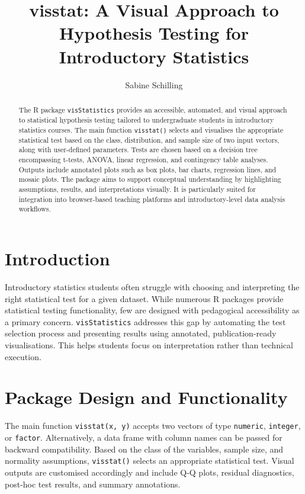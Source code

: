 \documentclass[11pt]{article}
\title{visstat: A Visual Approach to Hypothesis Testing for Introductory Statistics}
\author{Sabine Schilling}
\date{}
\begin{document}
\maketitle

\begin{abstract}
The R package \texttt{visStatistics} provides an accessible, automated, and visual approach to statistical hypothesis testing tailored to undergraduate students in introductory statistics courses. The main function \texttt{visstat()} selects and visualises the appropriate statistical test based on the class, distribution, and sample size of two input vectors, along with user-defined parameters. Tests are chosen based on a decision tree encompassing t-tests, ANOVA, linear regression, and contingency table analyses. Outputs include annotated plots such as box plots, bar charts, regression lines, and mosaic plots. The package aims to support conceptual understanding by highlighting assumptions, results, and interpretations visually. It is particularly suited for integration into browser-based teaching platforms and introductory-level data analysis workflows.
\end{abstract}

\section{Introduction}
Introductory statistics students often struggle with choosing and interpreting the right statistical test for a given dataset. While numerous R packages provide statistical testing functionality, few are designed with pedagogical accessibility as a primary concern. \texttt{visStatistics} addresses this gap by automating the test selection process and presenting results using annotated, publication-ready visualisations. This helps students focus on interpretation rather than technical execution.

\section{Package Design and Functionality}
The main function \texttt{visstat(x, y)} accepts two vectors of type \texttt{numeric}, \texttt{integer}, or \texttt{factor}. Alternatively, a data frame with column names can be passed for backward compatibility. Based on the class of the variables, sample size, and normality assumptions, \texttt{visstat()} selects an appropriate statistical test. Visual outputs are customised accordingly and include Q-Q plots, residual diagnostics, post-hoc test results, and summary annotations.
\end{document}

